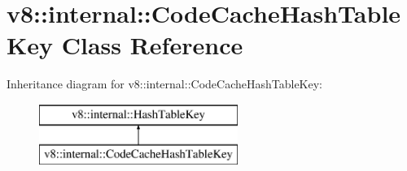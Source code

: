 \hypertarget{classv8_1_1internal_1_1_code_cache_hash_table_key}{}\section{v8\+:\+:internal\+:\+:Code\+Cache\+Hash\+Table\+Key Class Reference}
\label{classv8_1_1internal_1_1_code_cache_hash_table_key}
Inheritance diagram for v8\+:\+:internal\+:\+:Code\+Cache\+Hash\+Table\+Key\+:\begin{figure}[H]
\begin{center}
\leavevmode
\includegraphics[height=2.000000cm]{classv8_1_1internal_1_1_code_cache_hash_table_key}
\end{center}
\end{figure}
